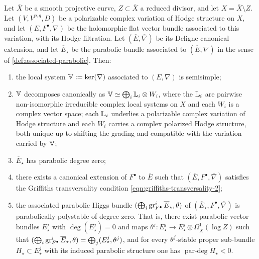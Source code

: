 \begin{proposition}
  Let \(\overline{X}\) be a smooth projective curve, \(Z \subset \overline{X}\) a
  reduced divisor, and let \(X = \overline{X} \setminus Z\). Let
  \((V, V^{p,q}, D)\) be a polarizable complex variation of Hodge structure on
  \(X\), and let \((E, F^\bullet, \nabla)\) be the holomorphic flat vector bundle
  associated to this variation, with its Hodge filtration. Let
  \((\overline{E}, \overline{\nabla})\) be its Deligne canonical extension, and let
  \(\overline{E}_\star\) be the parabolic bundle associated to
  \((\overline{E}, \nabla)\) in the sense of \cref{def:associated-parabolic}. Then:
  \begin{enumerate}
    \item the local system \(\mathbb{V} := \ker(\nabla)\) associated to \((E, \nabla)\) is
      semisimple;
    \item \(\mathbb{V}\) decomposes canonically as
      \(\mathbb{V} \simeq \bigoplus_i \mathbb{L}_i \otimes W_i\), where the \(\mathbb{L}_i\) are pairwise
      non-isomorphic irreducible complex local systems on \(X\) and each \(W_i\) is
      a complex vector space; each \(\mathbb{L}_i\) underlies a polarizable complex
      variation of Hodge structure and each \(W_i\) carries a complex polarized
      Hodge structure, both unique up to shifting the grading and compatible with
      the variation carried by \(\mathbb{V}\);
    \item \(\overline{E}_\star\) has parabolic degree zero;
    \item there exists a canonical extension of \(F^\bullet\) to \(\overline{E}\)
      such that \((\overline{E}, F^\bullet, \overline{\nabla})\) satisfies the
      Griffiths transversality condition \eqref{eqn:griffiths-transversality-2};
    \item the associated parabolic Higgs bundle
      \((\bigoplus_i \operatorname{gr}^i_{F^\bullet} \overline{E}_\star, \theta)\) of
      \((\overline{E}_\star, F^\bullet, \overline{\nabla})\) is parabolically
      polystable of degree zero. That is, there exist parabolic vector bundles
      \(E^j_\star\) with \(\deg(E^j_\star) = 0\) and maps
      \(\theta^j : E^j_\star \to E^j_\star \otimes \Omega^1_{\overline{X}}(\log Z)\)
      such that
      \((\bigoplus_i \operatorname{gr}^i_{F^\bullet} \overline{E}_\star, \theta) =
      \bigoplus_j (E^j_\star, \theta^j)\), and for every \(\theta^j\)-stable proper
      sub-bundle \(H_\star \subset E^j_\star\) with its induced parabolic structure
      one has \(\operatorname{par-deg} H_\star < 0\).
  \end{enumerate}
\end{proposition}

